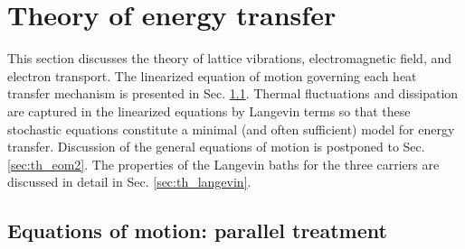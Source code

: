 

% 

\section{Theory of energy transfer}
\label{sec:theory}

% 
This section discusses the theory of lattice vibrations, electromagnetic field, and electron transport. The linearized equation of motion governing each heat transfer mechanism is presented in Sec. \ref{sec:th_eom}. Thermal fluctuations and dissipation are captured in the linearized equations by Langevin terms so that these stochastic equations constitute a minimal (and often sufficient) model for energy transfer. Discussion of the general equations of motion is postponed to Sec. \ref{sec:th_eom2}. The properties of the Langevin baths for the three carriers are discussed in detail in Sec. \ref{sec:th_langevin}.  



\subsection{Equations of motion: parallel treatment}
\label{sec:th_eom}

